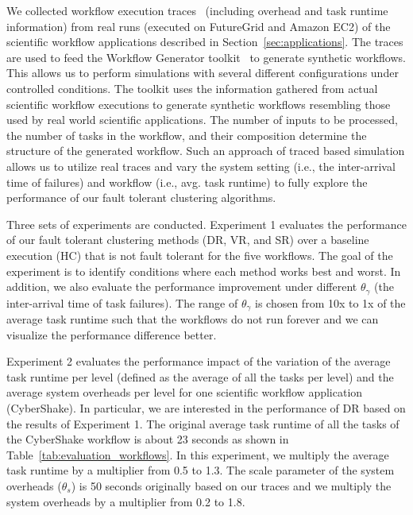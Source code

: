\documentclass{IOS-Book-Article}
\begin{document}
We collected workflow execution traces~\cite{Juve2013, Chen2011} (including overhead and task runtime information) from real runs (executed on FutureGrid and Amazon EC2) of the scientific workflow applications described in Section~\ref{sec:applications}. The traces are used to feed the Workflow Generator toolkit~\cite{WorkflowGenerator} to generate synthetic workflows. This allows us to perform simulations with several different configurations under controlled conditions. The toolkit uses the information gathered from actual scientific workflow executions to generate synthetic workflows resembling those used by real world scientific applications. The number of inputs to be processed, the number of tasks in the workflow, and their composition determine the structure of the generated workflow. Such an approach of traced based simulation allows us to utilize real traces and vary the system setting (i.e., the inter-arrival time of failures) and workflow (i.e., avg. task runtime) to fully explore the performance of our fault tolerant clustering algorithms. 

Three sets of experiments are conducted. Experiment 1 evaluates the performance of our fault tolerant clustering methods (DR, VR, and SR) over a baseline execution (HC) that is not fault tolerant for the five workflows. The goal of the experiment is to identify conditions where each method works best and worst. In addition, we also evaluate the performance improvement under different $\theta_{\gamma}$ (the inter-arrival time of task failures). The range of $\theta_{\gamma}$ is chosen from 10x to 1x of the average task runtime such that the workflows do not run forever and we can visualize the performance difference better. 


Experiment 2 evaluates the performance impact of the variation of the average task runtime per level (defined as the average of all the tasks per level) and the average system overheads per level for one scientific workflow application (CyberShake). In particular, we are interested in the performance of DR based on the results of Experiment 1. The original average task runtime of all the tasks of the CyberShake workflow is about 23 seconds as shown in Table~\ref{tab:evaluation_workflows}. In this experiment, we multiply the average task runtime by a multiplier from 0.5 to 1.3. The scale parameter of the system overheads ($\theta_{s}$) is 50 seconds originally based on our traces and we multiply the system overheads by a multiplier from 0.2 to 1.8. 
\end{document}
